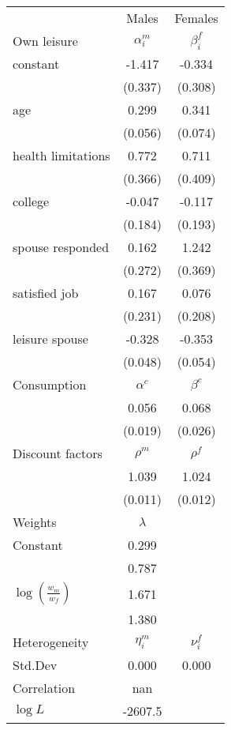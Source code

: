 \begin{tabular}{lcc} 
\hline\hline 
 & Males & Females \\ 
Own leisure & $\alpha_{i}^{m}$ & $\beta_{i}^{f}$ \\ 
constant & -1.417 & -0.334 \\ 
 & (0.337) & (0.308) \\ 
age & 0.299 & 0.341 \\ 
 & (0.056) & (0.074) \\ 
health limitations & 0.772 & 0.711 \\ 
 & (0.366) & (0.409) \\ 
college & -0.047 & -0.117 \\ 
 & (0.184) & (0.193) \\ 
spouse responded & 0.162 & 1.242 \\ 
 & (0.272) & (0.369) \\ 
satisfied job & 0.167 & 0.076 \\ 
 & (0.231) & (0.208) \\ 
leisure spouse & -0.328 & -0.353 \\ 
 & (0.048) & (0.054) \\ 
Consumption & $\alpha^{c}$ & $\beta^{c}$ \\ 
 & 0.056 & 0.068 \\ 
 & (0.019) & (0.026) \\ 
Discount factors & $\rho^m$ & $\rho^f$ \\ 
 & 1.039 & 1.024 \\ 
 & (0.011) & (0.012) \\ 
Weights & $\lambda$ &  \\ 
Constant & 0.299 &  \\ 
 & 0.787 &  \\ 
$\log(\frac{w_m}{w_f})$ & 1.671 &  \\ 
 & 1.380 &  \\ 
Heterogeneity & $\eta_i^m$ & $\nu_i^f$ \\ 
Std.Dev & 0.000 & 0.000 \\ 
Correlation & nan &  \\ 
\hline 
$\log L$ & -2607.5 & \\ 
\hline \hline 
\end{tabular} 
